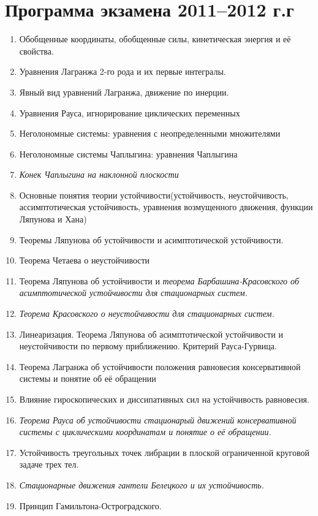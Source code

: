 \documentclass[a4paper,12pt]{article}
\begin{document}
\section*{Программа экзамена 2011--2012 г.г}
\begin{enumerate}
\item Обобщенные координаты, обобщенные силы, кинетическая энергия и
  её свойства.
\item Уравнения Лагранжа 2-го рода и их первые интегралы.
\item Явный вид уравнений Лагранжа, движение по инерции.
\item Уравнения Рауса, игнорирование циклических переменных
\item {Неголономные системы: уравнения с неопределенными множителями}
\item {Неголономные системы Чаплыгина: уравнения Чаплыгина}
\item \textit{Конек Чаплыгина на наклонной плоскости}
\item Основные понятия теории устойчивости(устойчивость, неустойчивость,
  ассимптотическая устойчивость, уравнения возмущенного движения, функции Ляпунова и Хана)
\item Теоремы Ляпунова об устойчивости и асимптотической устойчивости.
\item Теорема Четаева о неустойчивости
\item Теорема Ляпунова об устойчивости и \textit{теорема Барбашина-Красовского об
асимптотической устойчивости для стационарных систем.}
\item \textit{Теорема Красовского о неустойчивости для стационарных систем.}
\item Линеаризация. Теорема Ляпунова об асимптотической устойчивости и неустойчивости
  по первому приближению. Критерий Рауса-Гурвица.
\item Теорема Лагранжа об устойчивости положения равновесия
  консервативной системы и понятие об её обращении
\item Влияние гироскопических и диссипативных сил на устойчивость равновесия.
\item \textit{Теорема Рауса об устойчивости стационарый движений консервативной системы с циклическими координатам и понятие о её обращении.}
\item Устойчивость треугольных точек либрации в плоской ограниченной круговой задаче трех тел.
\item \textit{Стационарные движения гантели Белецкого и их устойчивость.}
\item Принцип Гамильтона-Остроградского.

\end{enumerate}
\end{document}
